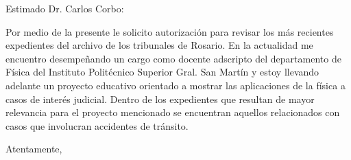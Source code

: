 \documentclass{letter}
\begin{document}
\begin{letter}
  
  \opening{Estimado Dr. Carlos Corbo:}

    Por medio de la presente le solicito autorización para revisar los más recientes expedientes del archivo de los tribunales de Rosario. En la actualidad me encuentro desempeñando un cargo como docente adscripto del departamento de Física del Instituto Politécnico Superior Gral. San Martín y estoy llevando adelante un proyecto educativo orientado a mostrar las aplicaciones de la física a casos de interés judicial. Dentro de los expedientes que resultan de mayor relevancia para el proyecto mencionado se encuentran aquellos relacionados con casos que involucran accidentes de tránsito. 
  
  \closing{Atentamente,}
  
     
  \end{letter}
   
  
\end{document}
